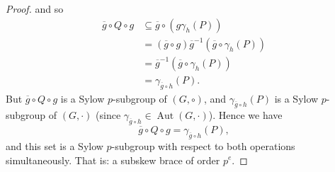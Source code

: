 \documentclass[10pt,a4paper]{amsart}
\DeclareMathOperator{\Aut}{\mbox{Aut}}
\renewcommand{\bar}{\overline}
\begin{document}
\begin{proof}
and so 
\begin{align*}
\bar{g} \circ Q \circ g & \subseteq \bar{g} \circ (g\gamma_{h}(P)) \\
& = (\bar{g} \circ g) \bar{g}^{-1} (\bar{g} \circ \gamma_{h}(P)) \\
& = \bar{g}^{-1} (\bar{g} \circ \gamma_{h}(P)) \\
& = \gamma_{\bar{g}\circ h}(P).
\end{align*}
But $ \bar{g} \circ Q \circ g $ is a Sylow $ p $-subgroup of $ (G,\circ) $, and $ \gamma_{\bar{g} \circ h}(P) $ is a Sylow $ p $-subgroup of $ (G,\cdot) $ (since $ \gamma_{\bar{g} \circ h} \in \Aut(G,\cdot) $). Hence we have
\[ \bar{g} \circ Q \circ g  = \gamma_{\bar{g} \circ h}(P), \]
and this set is a Sylow $ p $-subgroup with respect to both operations simultaneously. That is: a subskew brace of order $ p^{e} $. 
\end{proof}
\end{document}
